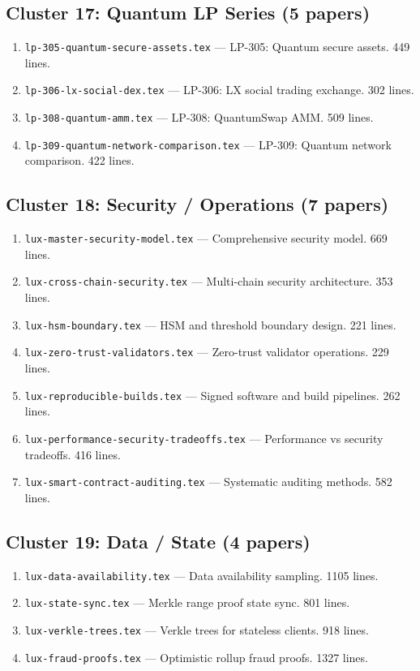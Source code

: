 \documentclass[11pt,a4paper]{article}
\begin{document}
\subsection{Cluster 17: Quantum LP Series (5 papers)}
\begin{enumerate}[leftmargin=2em]
\item \texttt{lp-305-quantum-secure-assets.tex} --- LP-305: Quantum secure assets. 449 lines.
\item \texttt{lp-306-lx-social-dex.tex} --- LP-306: LX social trading exchange. 302 lines.
\item \texttt{lp-308-quantum-amm.tex} --- LP-308: QuantumSwap AMM. 509 lines.
\item \texttt{lp-309-quantum-network-comparison.tex} --- LP-309: Quantum network comparison. 422 lines.
\end{enumerate}

\subsection{Cluster 18: Security / Operations (7 papers)}
\begin{enumerate}[leftmargin=2em]
\item \texttt{lux-master-security-model.tex} --- Comprehensive security model. 669 lines.
\item \texttt{lux-cross-chain-security.tex} --- Multi-chain security architecture. 353 lines.
\item \texttt{lux-hsm-boundary.tex} --- HSM and threshold boundary design. 221 lines.
\item \texttt{lux-zero-trust-validators.tex} --- Zero-trust validator operations. 229 lines.
\item \texttt{lux-reproducible-builds.tex} --- Signed software and build pipelines. 262 lines.
\item \texttt{lux-performance-security-tradeoffs.tex} --- Performance vs security tradeoffs. 416 lines.
\item \texttt{lux-smart-contract-auditing.tex} --- Systematic auditing methods. 582 lines.
\end{enumerate}

\subsection{Cluster 19: Data / State (4 papers)}
\begin{enumerate}[leftmargin=2em]
\item \texttt{lux-data-availability.tex} --- Data availability sampling. 1105 lines.
\item \texttt{lux-state-sync.tex} --- Merkle range proof state sync. 801 lines.
\item \texttt{lux-verkle-trees.tex} --- Verkle trees for stateless clients. 918 lines.
\item \texttt{lux-fraud-proofs.tex} --- Optimistic rollup fraud proofs. 1327 lines.
\end{enumerate}
\end{document}
